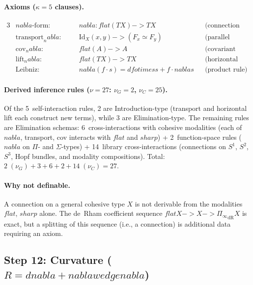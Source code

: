 \documentclass[11pt,a4paper]{article}
\def\to{->}%
\def\otimes{otimes}%
\def\nabla{nabla}%
\def\wedge{wedge}%
\def\flat{flat}%
\def\sharp{sharp}%
\theoremstyle{plain}
\theoremstyle{definition}
\theoremstyle{remark}
\begin{document}
\paragraph{Axioms ($\kappa = 5$ clauses).}
\begin{alignat*}{3}
    &\nabla\text{-form:}        &\quad& \nabla : \flat(TX) \to TX
        && \text{(connection operator)} \\
    &\mathrm{transport}_\nabla\text{:} && \mathrm{Id}_X(x, y) \to (F_x \simeq F_y)
        && \text{(parallel transport)} \\
    &\mathrm{cov}_\nabla\text{:}       && \flat(A) \to A
        && \text{(covariant derivative)} \\
    &\mathrm{lift}_\nabla\text{:}      && \flat(TX) \to TX
        && \text{(horizontal lift)} \\
    &\mathrm{Leibniz}\text{:}          && \nabla(f \cdot s) = df \otimes s + f \cdot \nabla s
        && \text{(product rule)}
\end{alignat*}

\paragraph{Derived inference rules ($\nu = 27$: $\nu_G = 2$, $\nu_C = 25$).}
Of the 5~self-interaction rules, 2 are Introduction-type (transport and horizontal lift each construct new terms), while 3 are Elimination-type.
The remaining rules are Elimination schemas: 6~cross-interactions with cohesive modalities (each of $\nabla$, transport, cov interacts with $\flat$ and $\sharp$) + 2~function-space rules ($\nabla$ on $\Pi$- and $\Sigma$-types) + 14~library cross-interactions (connections on $S^1$, $S^2$, $S^3$, Hopf bundles, and modality compositions).
Total: $2\;(\nu_G) + 3 + 6 + 2 + 14\;(\nu_C) = 27$.

\paragraph{Why not definable.}
A connection on a general cohesive type $X$ is not derivable from the modalities $\flat$, $\sharp$ alone.
The de~Rham coefficient sequence $\flat X \to X \to {\Pi_{\!\infty}}_{\mathrm{dR}} X$ is exact, but a splitting of this sequence (i.e., a connection) is additional data requiring an axiom.

\subsection{\texorpdfstring{Step 12: Curvature ($R = d\nabla + \nabla \wedge \nabla$)}{Step 12: Curvature (R = d nabla + nabla wedge nabla)}}
\label{app:curvature-spec}
\end{document}

